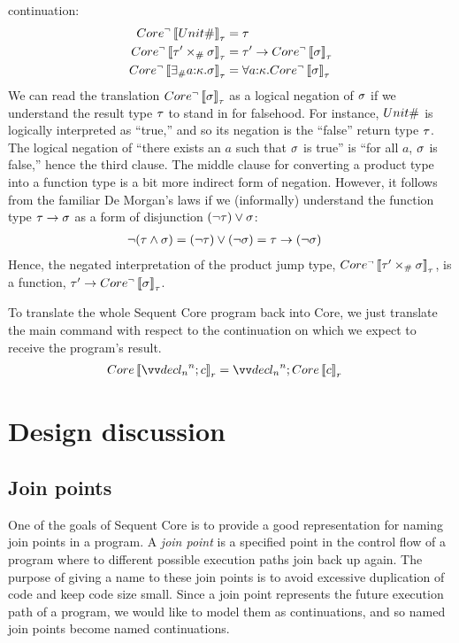 \documentclass{article}
\begin{document}
continuation:
\begin{align*}
  Core^\neg\left\llbracket{Unit\#}\right\rrbracket_{\tau} &= \tau
  \\
  Core^\neg\left\llbracket{\tau' \times_\#\sigma}\right\rrbracket_{\tau}
  &=
  \tau' \to Core^\neg\left\llbracket{\sigma}\right\rrbracket_{\tau}
  \\
  Core^\neg\left\llbracket{\exists_\#a{:}{\kappa}. \sigma}\right\rrbracket_{\tau}
  &=
  \forall a{:}{\kappa}. Core^\neg\left\llbracket{\sigma}\right\rrbracket_{\tau}
\end{align*}
We can read the translation $Core^\neg\left\llbracket{\sigma}\right\rrbracket_{\tau}$ as a logical negation
of $\sigma$ if we understand the result type $\tau$ to stand in for falsehood.  For
instance, $Unit\#$ is logically interpreted as ``true,'' and so its negation
is the ``false'' return type $\tau$.  The logical negation of ``there exists an
$a$ such that $\sigma$ is true'' is ``for all $a$, $\sigma$ is false,'' hence the
third clause.  The middle clause for converting a product type into a function
type is a bit more indirect form of negation.  However, it follows from the
familiar De Morgan's laws if we (informally) understand the function type
$\tau \to \sigma$ as a form of disjunction $(\neg \tau) \vee \sigma$:
\begin{align*}
  \neg(\tau \wedge \sigma)
  &=
  (\neg \tau) \vee (\neg \sigma)
  =
  \tau \to (\neg \sigma)
\end{align*}
Hence, the negated interpretation of the product jump type,
$Core^\neg\left\llbracket{\tau' \times_\#\sigma}\right\rrbracket_{\tau}$, is a function,
$\tau' \to Core^\neg\left\llbracket{\sigma}\right\rrbracket_{\tau}$.

To translate the whole Sequent Core program back into Core, we just translate
the main command with respect to the continuation on which we expect to receive
the program's result.
\begin{align*}
  Core\trans{\vect[n]{\decl_n}; \cmd}_{r}
  &=
  \vect[n]{\decl_n}; Core\trans{\cmd}_{r}
\end{align*}

\section{Design discussion}
\label{sec:design-discussion}

\subsection{Join points}

One of the goals of Sequent Core is to provide a good representation for naming
join points in a program.  A \emph{join point} is a specified point in the
control flow of a program where to different possible execution paths join back
up again.  The purpose of giving a name to these join points is to avoid
excessive duplication of code and keep code size small.  Since a join point
represents the future execution path of a program, we would like to model them
as continuations, and so named join points become named continuations.
\end{document}
